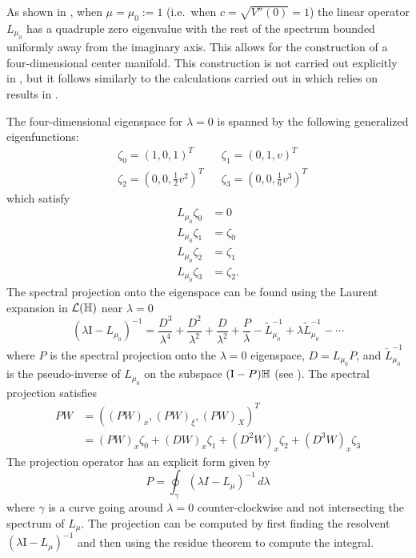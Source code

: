 As shown in \cite[Lem.\ 1]{iooss2000travelling}, when \(\mu = \mu_0:= 1\) (i.e.\ when \(c = \sqrt{V''(0)} = 1\)) the linear operator \(L_{\mu_0}\) has a quadruple zero eigenvalue with the rest of the spectrum bounded uniformly away from the imaginary axis. This allows for the construction of a four-dimensional center manifold. This construction is not carried out explicitly in \cite{iooss2000travelling}, but it follows similarly to the calculations carried out in \cite{iooss2000travelling2} which relies on results in \cite{vanderbauwhede1992center}.

The four-dimensional eigenspace for \(\lambda = 0\) is spanned by the following generalized eigenfunctions:
\begin{equation*}
	\begin{aligned}
		&\zeta_0 = (1,0,1)^T  & &\zeta_1 = (0,1,v)^T \\
		&\zeta_2 = (0, 0, \frac 12 v^2)^T & &\zeta_3 = (0,0,\frac 1 6 v^3)^T
	\end{aligned}
\end{equation*}
which satisfy
\begin{equation*}
	\begin{aligned}
		L_{\mu_0} \zeta_0 &= 0 \\
		L_{\mu_0} \zeta_1 &= \zeta_0 \\
		L_{\mu_0} \zeta_2 &= \zeta_1 \\
		L_{\mu_0} \zeta_3 &= \zeta_2.
	\end{aligned}
\end{equation*}
The spectral projection onto the eigenspace can be found using the Laurent expansion in \(\mathcal{L}(\mathbb{H})\) near \(\lambda = 0\)
\begin{equation*}
	(\lambda \mathrm I - L_{\mu_0} )^{-1} = \frac{D^3}{\lambda^4} + \frac{D^2}{\lambda^2} + \frac{D}{\lambda^2} + \frac P \lambda - \tilde L _{\mu_0} ^{-1} + \lambda \tilde L_{\mu_0} ^{-1} - \cdots
\end{equation*}
where \(P\) is the spectral projection onto the \(\lambda = 0\) eigenspace, \(D = L_{\mu_0} P\), and \(\tilde L _{\mu_0} ^{-1}\) is the pseudo-inverse of \(L_{\mu_0}\) on the subspace \((\mathrm I - P)\mathbb{H}\) (see \cite{kato2013perturbation}). The spectral projection satisfies %
\begin{equation*}
\begin{aligned}
	PW &= ((PW)_x, (PW)_\xi, (PW)_X)^T \\
	&= (PW)_x \zeta_0 + (DW)_x\zeta_1 + (D^2W)_x\zeta_2 + (D^3W)_x \zeta_3
\end{aligned}
\end{equation*}
The projection operator has an explicit form given by 
\begin{equation*}
	P = \oint_\gamma (\lambda I - L_\mu)^{-1} \, d\lambda
\end{equation*}
where \(\gamma\) is a curve going around \(\lambda = 0\) counter-clockwise and not intersecting the spectrum of \(L_\mu\). The projection can be computed by first finding the resolvent \((\lambda \mathrm I - L_\mu)^{-1}\) and then using the residue theorem to compute the integral. 

